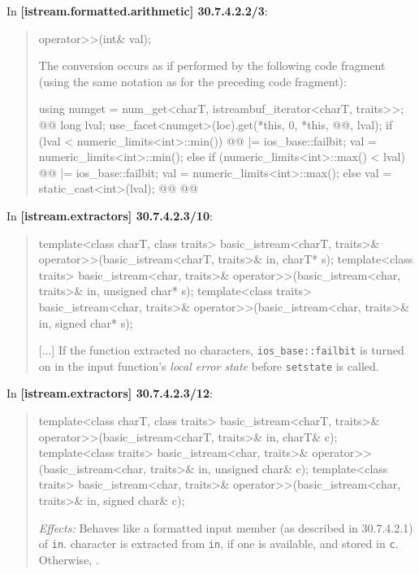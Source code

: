 \documentclass{wg21}
\begin{document}
In \textbf{[istream.formatted.arithmetic] 30.7.4.2.2/3}:
\begin{quote}
\begin{codeblock}
operator>>(int& val);
\end{codeblock}
The conversion occurs as if performed by the following code fragment (using the
same notation as for the preceding code fragment):
\begin{codeblock}
  using numget = num_get<charT, istreambuf_iterator<charT, traits>>;
  @@
  long lval;
  use_facet<numget>(loc).get(*this, 0, *this, @@, lval);
  if (lval < numeric_limits<int>::min()) {
    @@ |= ios_base::failbit;
    val = numeric_limits<int>::min();
  } else if (numeric_limits<int>::max() < lval) {
    @@ |= ios_base::failbit;
    val = numeric_limits<int>::max();
  }  else
    val = static_cast<int>(lval);
  @\added{\}}@
  @@
\end{codeblock}
\end{quote}

In \textbf{[istream.extractors] 30.7.4.2.3/10}:
\begin{quote}
\begin{codeblock}
template<class charT, class traits>
  basic_istream<charT, traits>& operator>>(basic_istream<charT, traits>& in, charT* s);
template<class traits>
  basic_istream<char, traits>& operator>>(basic_istream<char, traits>& in, unsigned char* s);
template<class traits>
  basic_istream<char, traits>& operator>>(basic_istream<char, traits>& in, signed char* s);
\end{codeblock}
[...]
If the function extracted no characters, 
{\texttt{ios_base::failbit} is turned on in the input function's \textit{local error state}
before \texttt{setstate} is called}.
\end{quote}

In \textbf{[istream.extractors] 30.7.4.2.3/12}:
\begin{quote}
\begin{codeblock}
template<class charT, class traits>
  basic_istream<charT, traits>& operator>>(basic_istream<charT, traits>& in, charT& c);
template<class traits>
  basic_istream<char, traits>& operator>>(basic_istream<char, traits>& in, unsigned char& c);
template<class traits>
  basic_istream<char, traits>& operator>>(basic_istream<char, traits>& in, signed char& c);
\end{codeblock}
\textit{Effects:} Behaves like a formatted input member (as described in 30.7.4.2.1)
of \texttt{in}.  character
is extracted from \texttt{in}, if one is available, and stored in \texttt{c}.
Otherwise, .
\end{quote}
\end{document}
